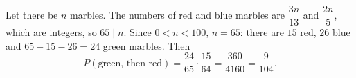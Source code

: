 Let there be $n$ marbles. The numbers of red and blue marbles are $\dfrac{3n}{13}$ and $\dfrac{2n}{5}$, which are integers, so $65\mid n$. Since $0<n<100$, $n=65$: there are $15$ red, $26$ blue and $65-15-26=24$ green marbles. Then
\[
P(\text{green, then red})=\dfrac{24}{65}\cdot\dfrac{15}{64}=\dfrac{360}{4160}=\boxed{\dfrac{9}{104}}.
\]
